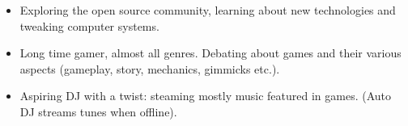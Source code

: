     \begin{itemize}
		\item Exploring the open source community, learning about new technologies and tweaking computer systems.

		\item Long time gamer, almost all genres. Debating about games and their various aspects (gameplay, story, mechanics, gimmicks etc.). 
		
		\item Aspiring DJ with a twist: steaming mostly music featured in games.  (Auto DJ streams tunes when offline).
	\end{itemize}